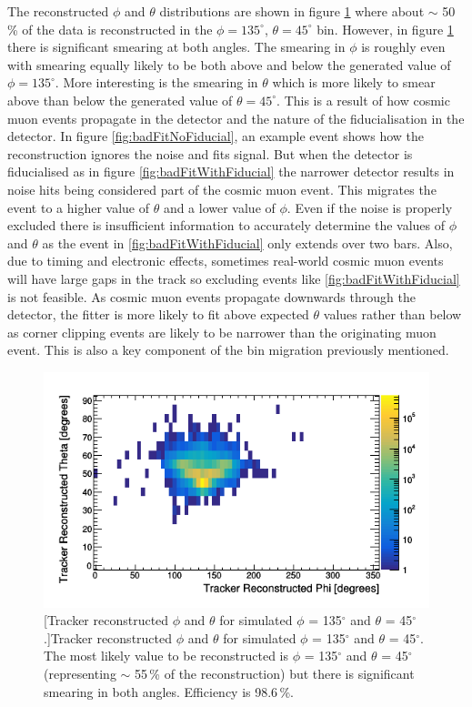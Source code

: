 The reconstructed $\phi$ and $\theta$ distributions are shown in figure \ref{fig:pVsTWithDeadLog} where about $\sim$ 50\,\% of the data is reconstructed in the $\phi = 135^\circ$, $\theta = 45^\circ$ bin. However, in figure \ref{fig:pVsTWithDeadLog} there is significant smearing at both angles. The smearing in $\phi$ is roughly even with smearing equally likely to be both above and below the generated value of $\phi = 135^\circ$. More interesting is the smearing in $\theta$ which is more likely to smear above than below the generated value of $\theta = 45^\circ$. This is a result of how cosmic muon events propagate in the detector and the nature of the fiducialisation in the detector. In figure \ref{fig:badFitNoFiducial}, an example event shows how the reconstruction ignores the noise and fits signal. But when the detector is fiducialised as in figure \ref{fig:badFitWithFiducial} the narrower detector results in noise hits being considered part of the cosmic muon event. This migrates the event to a higher value of $\theta$ and a lower value of $\phi$. Even if the noise is properly excluded there is insufficient information to accurately determine the values of $\phi$ and $\theta$ as the event in \ref{fig:badFitWithFiducial} only extends over two bars. Also, due to timing and electronic effects, sometimes real-world cosmic muon events will have large gaps in the track so excluding events like \ref{fig:badFitWithFiducial} is not feasible. As cosmic muon events propagate downwards through the detector, the fitter is more likely to fit above expected $\theta$ values rather than below as corner clipping events are likely to be narrower than the originating muon event. This is also a key component of the bin migration previously mentioned. 

\begin{figure}[!h]
 \centering
 \includegraphics[width=0.7\linewidth]{Chapter5/Figs/cosmicTrackerUncertainties/pVsTWithDeadLog.png}
 [Tracker reconstructed $\phi$ and $\theta$ for simulated $\phi$ = 135$^\circ$ and $\theta$ = 45$^\circ$.]{Tracker reconstructed $\phi$ and $\theta$ for simulated $\phi$ = 135$^\circ$ and $\theta$ = 45$^\circ$. The most likely value to be reconstructed is $\phi$ = 135$^\circ$ and $\theta$ = 45$^\circ$ (representing $\sim$ 55\,\% of the reconstruction) but there is significant smearing in both angles. Efficiency is 98.6\,\%.} 
 \label{fig:pVsTWithDeadLog}
\end{figure}

